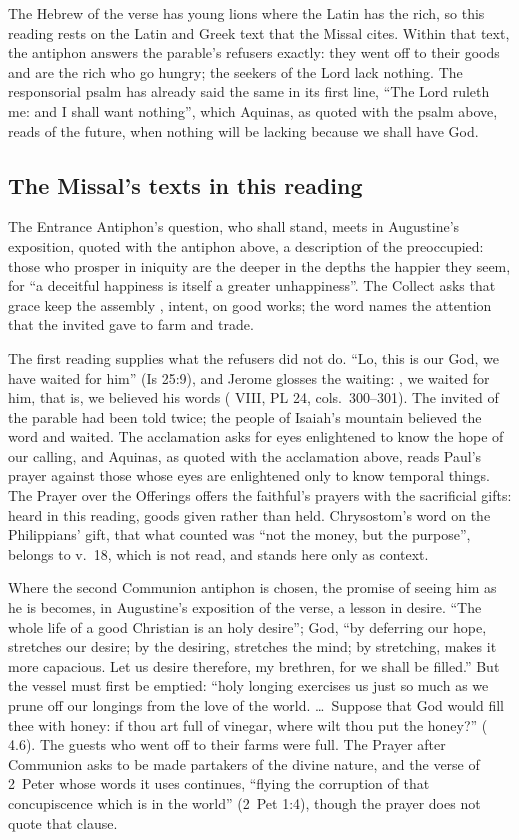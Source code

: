 The Hebrew of the verse has young lions where the Latin has the rich, so this
reading rests on the Latin and Greek text that the Missal cites. Within that
text, the antiphon answers the parable's refusers exactly: they went off to
their goods and are the rich who go hungry; the seekers of the Lord lack
nothing. The responsorial psalm has already said the same in its first line,
``The Lord ruleth me: and I shall want nothing'', which Aquinas, as quoted with
the psalm above, reads of the future, when nothing will be lacking because we
shall have God.

\subsection{The Missal's texts in this reading}

The Entrance Antiphon's question, who shall stand, meets in Augustine's
exposition, quoted with the antiphon above, a description of the preoccupied:
those who prosper in iniquity are the deeper in the depths the happier they
seem, for ``a deceitful happiness is itself a greater unhappiness''. The Collect
asks that grace keep the assembly , intent, on good works; the
word names the attention that the invited gave to farm and trade.

The first reading supplies what the refusers did not do. ``Lo, this is our
God, we have waited for him'' (Is 25:9), and Jerome glosses the waiting:
, we waited for him,
that is, we believed his words ( VIII, PL 24,
cols.~300--301). The invited of the parable had been told twice; the people of
Isaiah's mountain believed the word and waited.
The acclamation asks for eyes enlightened to know the hope of our calling, and
Aquinas, as quoted with the acclamation above, reads Paul's prayer against
those whose eyes are enlightened only to know temporal things. The Prayer
over the Offerings offers the faithful's prayers with the sacrificial gifts:
heard in this reading, goods given rather than held. Chrysostom's word on the
Philippians' gift, that what counted was ``not the money, but the purpose'',
belongs to v.~18, which is not read, and stands here only as context.

Where the second Communion antiphon is chosen, the promise of seeing him as he
is becomes, in Augustine's exposition of the verse, a lesson in desire. ``The
whole life of a good Christian is an holy desire''; God, ``by deferring our
hope, stretches our desire; by the desiring, stretches the mind; by
stretching, makes it more capacious. Let us desire therefore, my brethren, for
we shall be filled.'' But the vessel must first be emptied: ``holy longing
exercises us just so much as we prune off our longings from the love of the
world. \ldots\ Suppose that God would fill thee with honey: if thou art full of
vinegar, where wilt thou put the honey?'' ( 4.6). The guests who went off to their farms were full. The Prayer
after Communion asks to be made partakers of the divine nature, and the verse
of 2~Peter whose words it uses continues, ``flying the corruption of that
concupiscence which is in the world'' (2~Pet 1:4), though the prayer does not
quote that clause.

